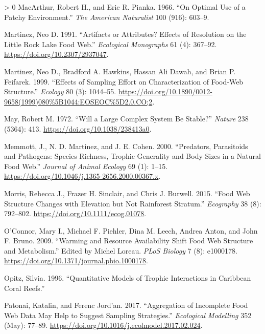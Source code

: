 \documentclass{article}
\newlength{\cslhangindent}
\newenvironment{CSLReferences}[3] %
 {%
  \setlength{\parindent}{0pt}
  \ifodd #1 \everypar{\setlength{\hangindent}{\cslhangindent}}\ignorespaces\fi
  \ifnum #2 > 0
  \setlength{\parskip}{#2\baselineskip}
  \fi
 }%
 {}
\begin{document}
\begin{CSLReferences}{1}{0}
\leavevmode\hypertarget{ref-macarthurOptimalUsePatchy1966}{}%
MacArthur, Robert H., and Eric R. Pianka. 1966. {``On {Optimal Use} of a
{Patchy Environment}.''} \emph{The American Naturalist} 100 (916):
603--9.

\leavevmode\hypertarget{ref-martinezArtifactsAttributesEffects1991}{}%
Martinez, Neo D. 1991. {``Artifacts or {Attributes}? {Effects} of
{Resolution} on the {Little Rock Lake Food Web}.''} \emph{Ecological
Monographs} 61 (4): 367--92. \url{https://doi.org/10.2307/2937047}.

\leavevmode\hypertarget{ref-martinezEffectsSamplingEffort1999}{}%
Martinez, Neo D., Bradford A. Hawkins, Hassan Ali Dawah, and Brian P.
Feifarek. 1999. {``Effects of {Sampling Effort} on {Characterization} of
{Food}-{Web Structure}.''} \emph{Ecology} 80 (3): 1044--55.
\url{https://doi.org/10.1890/0012-9658(1999)080\%5B1044:EOSEOC\%5D2.0.CO;2}.

\leavevmode\hypertarget{ref-mayWillLargeComplex1972}{}%
May, Robert M. 1972. {``Will a {Large Complex System} Be {Stable}?''}
\emph{Nature} 238 (5364): 413. \url{https://doi.org/10.1038/238413a0}.

\leavevmode\hypertarget{ref-memmottPredatorsParasitoidsPathogens2000}{}%
Memmott, J., N. D. Martinez, and J. E. Cohen. 2000. {``Predators,
Parasitoids and Pathogens: Species Richness, Trophic Generality and Body
Sizes in a Natural Food Web.''} \emph{Journal of Animal Ecology} 69 (1):
1--15. \url{https://doi.org/10.1046/j.1365-2656.2000.00367.x}.

\leavevmode\hypertarget{ref-morrisFoodWebStructure2015}{}%
Morris, Rebecca J., Frazer H. Sinclair, and Chris J. Burwell. 2015.
{``Food Web Structure Changes with Elevation but Not Rainforest
Stratum.''} \emph{Ecography} 38 (8): 792--802.
\url{https://doi.org/10.1111/ecog.01078}.

\leavevmode\hypertarget{ref-oconnorWarmingResourceAvailability2009}{}%
O'Connor, Mary I., Michael F. Piehler, Dina M. Leech, Andrea Anton, and
John F. Bruno. 2009. {``Warming and {Resource Availability Shift Food
Web Structure} and {Metabolism}.''} Edited by Michel Loreau. \emph{PLoS
Biology} 7 (8): e1000178.
\url{https://doi.org/10.1371/journal.pbio.1000178}.

\leavevmode\hypertarget{ref-opitz1996}{}%
Opitz, Silvia. 1996. {``Quantitative Models of Trophic Interactions in
Caribbean Coral Reefs.''}

\leavevmode\hypertarget{ref-patonaiAggregationIncompleteFood2017}{}%
Patonai, Katalin, and Ferenc Jord'an. 2017. {``Aggregation of Incomplete
Food Web Data May Help to Suggest Sampling Strategies.''}
\emph{Ecological Modelling} 352 (May): 77--89.
\url{https://doi.org/10.1016/j.ecolmodel.2017.02.024}.


\end{CSLReferences}
\end{document}
